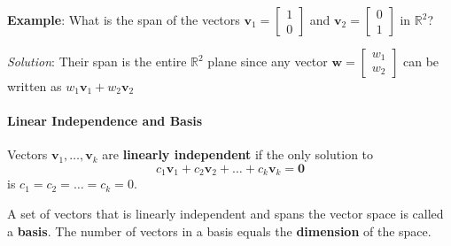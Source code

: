 \begin{exampleBox}
    \textbf{Example}: What is the span of the vectors $ \mathbf{v}_1 = \begin{bmatrix}1 \\ 0\end{bmatrix} $ and $ \mathbf{v}_2 = \begin{bmatrix}0 \\ 1\end{bmatrix} $ in $ \mathbb{R}^2 $?

    \emph{Solution}: Their span is the entire $ \mathbb{R}^2 $ plane since any vector $ \mathbf{w} = \begin{bmatrix}w_1 \\ w_2\end{bmatrix} $ can be written as $ w_1 \mathbf{v}_1 + w_2 \mathbf{v}_2 $
\end{exampleBox}

\paragraph*{Linear Independence and Basis}
Vectors $ \mathbf{v}_1, \ldots, \mathbf{v}_k $ are \textbf{linearly independent} if the only solution to
\begin{equation*}
    c_1 \mathbf{v}_1 + c_2 \mathbf{v}_2 + \ldots + c_k \mathbf{v}_k = \mathbf{0}
\end{equation*}
is $ c_1 = c_2 = \ldots = c_k = 0 $.

A set of vectors that is linearly independent and spans the vector space is called a \textbf{basis}. The number of vectors in a basis equals the \textbf{dimension} of the space.


